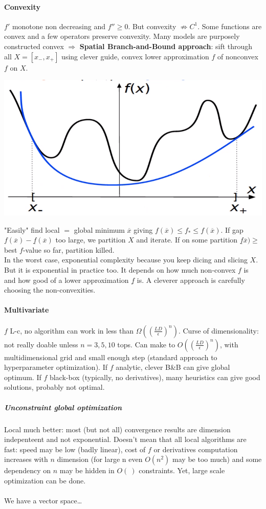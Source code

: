 \documentclass[10pt]{report}
\begin{document}
\paragraph{Convexity} $f'$ monotone non decreasing and $f'' \geq 0$. But convexity $\not\Rightarrow C^1$. Some functions are convex and a few operators preserve convexity. Many models are purposely constructed convex $\Rightarrow$  \textbf{Spatial Branch-and-Bound approach}: sift through all $X = [x_-, x_+]$ using clever guide, convex lower approximation \underline{$f$} of nonconvex $f$ on $X$.
\begin{center}
	\includegraphics[scale=0.5]{2.png}
\end{center}
"Easily" find local $=$ global minimum $\overline{x}$ giving \underline{$f$}$(\overline{x}) \leq f_* \leq f(\overline{x})$. If gap $f(\overline{x}) - \underline{f}(\overline{x})$ too large, we partition $X$ and iterate. If on some partition $\underline{f}\overline{x}) \geq$ best $f$-value so far, partition killed.\\
In the worst case, exponential complexity because you keep dicing and slicing $X$. But it is exponential in practice too. It depends on how much non-convex $f$ is and how good of a lower approximation $\underline{f}$ is. A cleverer approach is carefully choosing the non-convexities.
\paragraph{Multivariate} $f$ L-c, no algorithm can work in less than $\Omega((\frac{LD}{\epsilon})^n)$. Curse of dimensionality: not really doable unless $n = 3, 5, 10$ tops. Can make to $O((\frac{LD}{\epsilon})^n)$, with multidimensional grid and small enough step (standard approach to hyperparameter optimization). If $f$ analytic, clever B\&B can give global optimum. If $f$ black-box (typically, no derivatives), many heuristics can give good solutions, probably not optimal.
\subparagraph{Unconstraint global optimization} Local much better: most (but not all) convergence results are dimension indepenteent and not exponential. Doesn't mean that all local algorithms are fast: speed may be low (badly linear), cost of $f$ or derivatives computation increases with $n$ dimension (for large n even $O(n^2)$ may be too much) and some dependency on $n$ may be hidden in $O(\:)$ constraints. Yet, large scale optimization can be done.\\\\
We have a vector space\ldots\\
\end{document}
